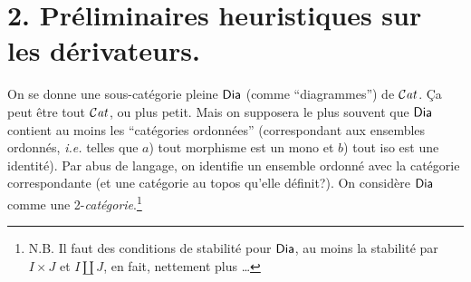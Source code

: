 \section*{2. Préliminaires heuristiques sur les dérivateurs.}

On se donne une sous-catégorie pleine $\mathsf{Dia}$ (comme “diagrammes”) de $\mathcal{C}\mathit{at}$. Ça peut être tout $\mathcal{C}\mathit{at}$, ou plus petit. Mais on supposera le plus souvent que $\mathsf{Dia}$ contient au moins les “catégories ordonnées” (correspondant aux ensembles ordonnés, \textit{i.e.} telles que $a$) tout morphisme est un mono et $b$) tout iso est une identité). Par abus de langage, on identifie un ensemble ordonné avec la catégorie correspondante (et une catégorie au topos qu'elle définit?). On considère $\mathsf{Dia}$ comme une 2-\textit{catégorie}.\footnote{N.B. Il faut des conditions de stabilité pour $\mathsf{Dia}$, au moins la stabilité par $I \times J$ et $I \amalg J$, en fait, nettement plus \dots}

